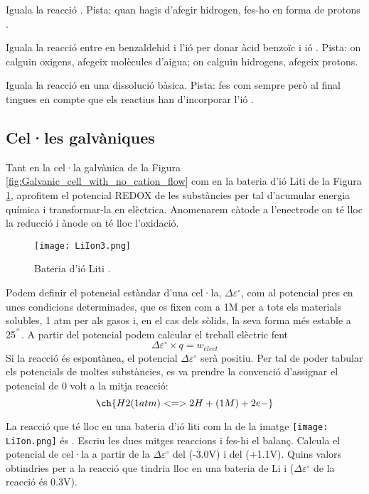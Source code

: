 \begin{exr}
Iguala la reacció . Pista: quan hagis d'afegir hidrogen, fes-ho en forma de protons .
\end{exr}

\begin{exr}
Iguala la reacció entre en benzaldehid i l'ió  per donar àcid benzoïc i ió . Pista: on calguin oxigens, afegeix molècules d'aigua; on calguin hidrogens, afegeix protons.
\end{exr}

\begin{exr}
Iguala la reacció  en una dissolució bàsica. Pista: fes com sempre però al final tingues en compte que els reactius han d'incorporar l'ió .
\end{exr}

\subsection{Cel·les galvàniques}

Tant en la cel·la galvànica de la Figura \ref{fig:Galvanic_cell_with_no_cation_flow} com en la bateria d'ió Liti de la Figura \ref{fig:LiIon3}, aprofitem el potencial REDOX de les substàncies per tal d'acumular energia química i transformar-la en elèctrica. 
Anomenarem càtode a l'enectrode on té lloc la reducció i ànode on té lloc l'oxidació.

\begin{figure}[h]
\centering
\texttt{[image: LiIon3.png]}
\caption{Bateria d'ió Liti \cite{liu_understanding_2016}.}
\label{fig:LiIon3}
\end{figure}

Podem definir el potencial estàndar d'una cel·la, $\Delta \varepsilon^{\circ}$, com al potencial pres en unes condicions determinades, que es fixen com a 1M per a tots els materials solubles, 1 atm per als gasos i, en el cas dels sòlids, la seva forma més estable a 25$^{\degree}$.
A partir del potencial podem calcular el treball elèctric fent
\[\Delta \varepsilon^{\circ} \times q = w_{elect}\]
Si la reacció és espontànea, el potencial $\Delta \varepsilon^{\circ}$ serà positiu.
Per tal de poder tabular els potencials de moltes substàncies, es va prendre la convenció d'assignar el potencial de 0 volt a la mitja reacció:
\[\ch{H2 (1 atm) <=> 2 H+ (1 M) + 2 e-}\]

\begin{exr}
La reacció que té lloc en una bateria d'ió liti com la de la imatge
\texttt{[image: LiIon.png]}
és . Escriu les dues mitges reaccions i fes-hi el balanç. Calcula el potencial de cel·la a partir de la $\Delta \varepsilon^{\circ}$ del  (-3.0V) i del  (+1.1V).
Quins valors obtindries per a la reacció que tindria lloc en una bateria de Li i  ($\Delta \varepsilon^{\circ}$ de la reacció  és 0.3V).
\end{exr}

